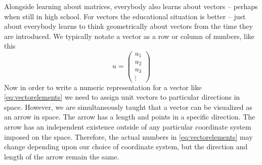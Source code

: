 \documentclass[onefignum,onetabnum]{siamart190516}
\begin{document}
Alongside learning about matrices, everybody also learns about vectors -- 
perhaps when still in high school.  For vectors the educational situation
is better -- just about everybody learns to think geometrically about
vectors from the time they are introduced.  
We typically notate a vector as a
row or column of numbers, like this
\begin{equation}
u = 
\begin{pmatrix}
	u_1  \\
	u_2  \\
	u_3  \\
	\vdots
	\label{eq:vectorelements}
\end{pmatrix}
\end{equation}
Now in order
to write a numeric representation for a vector like \eqref{eq:vectorelements} we need to
assign unit vectors to particular directions in space.  
However, we are simultaneously taught that a vector can be
visualized as an arrow in space.  The arrow has a length and points in
a specific direction.  The arrow has an independent existence outside
of any particular coordinate system imposed on the space.  Therefore, the
actual numbers in \cref{eq:vectorelements} may change depending upon
our choice of coordinate system, but the 
direction and length of the arrow remain the same.
 
\end{document}
